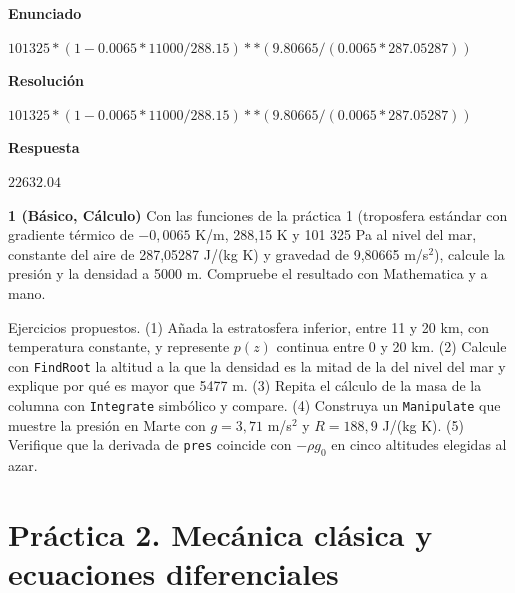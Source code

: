 \documentclass[10pt,openany]{book}
\begin{document}
\begin{tcolorbox}[title={Problema resuelto}, studiumworked, breakable]

\noindent\textbf{Enunciado}

\(101325*(1 - 0.0065*11000/288.15)**(9.80665/(0.0065*287.05287))\)

\noindent\textbf{Resolución}

\(101325*(1 - 0.0065*11000/288.15)**(9.80665/(0.0065*287.05287))\)

\noindent\textbf{Respuesta}

\(22632.04\)
\end{tcolorbox}

\begin{tcolorbox}[title={Ejercicios propuestos}, studiumworked, breakable]

\noindent\textbf{1 (Básico, Cálculo)}
Con las funciones de la práctica 1 (troposfera estándar con gradiente térmico de \(-0{,}0065\) K/m, 288,15 K y 101 325 Pa al nivel del mar, constante del aire de 287,05287 J/(kg K) y gravedad de 9,80665 m/s\(^2\)), calcule la presión y la densidad a 5000 m. Compruebe el resultado con Mathematica y a mano.
\end{tcolorbox}

\begin{tcolorbox}[title={Autoevaluación}, studiumcheck, breakable]

Ejercicios propuestos. (1) Añada la estratosfera inferior, entre 11 y 20 km, con temperatura constante, y represente \(p(z)\) continua entre 0 y 20 km. (2) Calcule con \texttt{FindRoot} la altitud a la que la densidad es la mitad de la del nivel del mar y explique por qué es mayor que 5477 m. (3) Repita el cálculo de la masa de la columna con \texttt{Integrate} simbólico y compare. (4) Construya un \texttt{Manipulate} que muestre la presión en Marte con \(g = 3{,}71\) m/s\(^2\) y \(R = 188{,}9\) J/(kg K). (5) Verifique que la derivada de \texttt{pres} coincide con \(-\rho g_0\) en cinco altitudes elegidas al azar.
\end{tcolorbox}
\studiumchaptercheck

\chapter{Práctica 2. Mecánica clásica y ecuaciones diferenciales}
\label{chap:m02}

\end{document}
